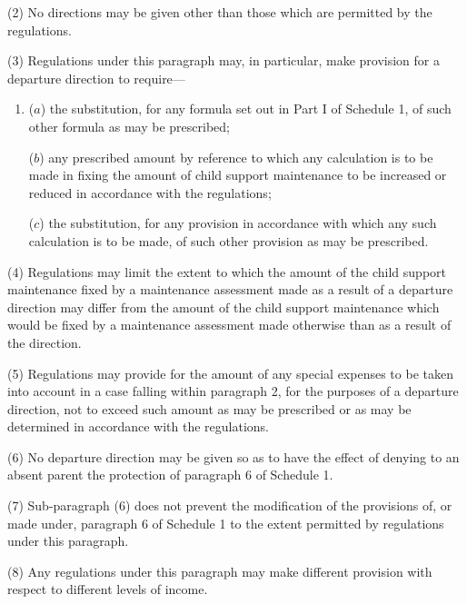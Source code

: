 \documentclass[a4paper]{article}
\begin{document}
{(2) No directions may be given other than those which are permitted by the regulations.

(3)
Regulations under this paragraph may, in particular, make provision for a departure direction to require---
\begin{enumerate}\item[]
($a$) the substitution, for any formula set out in Part I of Schedule 1, of such other
formula as may be prescribed;

($b$) any prescribed amount by reference to which any calculation is to be made
in fixing the amount of child support maintenance to be increased or reduced
in accordance with the regulations;

($c$) the substitution, for any provision in accordance with which any such
calculation is to be made, of such other provision as may be prescribed.
\end{enumerate}

(4)
Regulations may limit the extent to which the amount of the child support maintenance fixed by a maintenance assessment made as a result of a departure direction may differ from the amount of the child support maintenance which would be fixed by a maintenance assessment made otherwise than as a result of the direction.

(5)
Regulations may provide for the amount of any special expenses to be taken into account in a case falling within paragraph 2, for the purposes of a departure direction, not to exceed such amount as may be prescribed or as may be determined in accordance with the regulations.

(6)
No departure direction may be given so as to have the effect of denying to an absent parent the protection of paragraph 6 of Schedule 1.

(7)
Sub-paragraph (6) does not prevent the modification of the provisions of, or made under, paragraph 6 of Schedule 1 to the extent permitted by regulations under this paragraph.

(8)
Any regulations under this paragraph may make different provision with respect to different levels of income.

}
\end{document}
